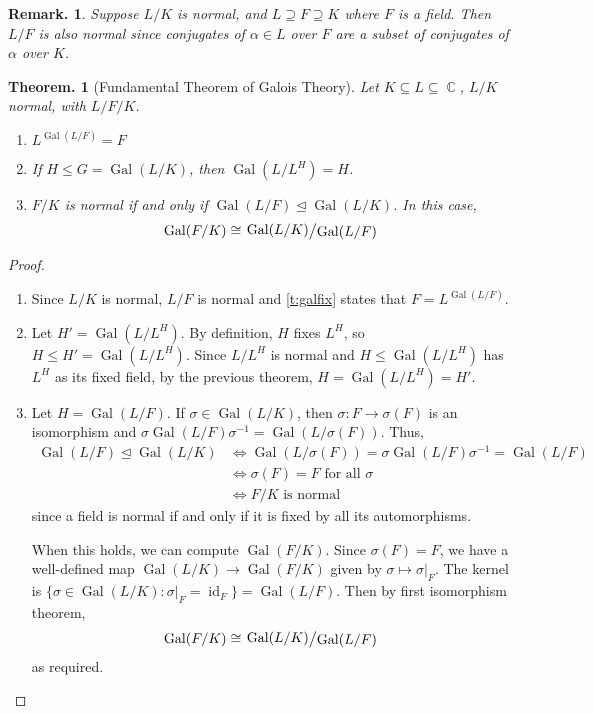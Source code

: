 \documentclass[11pt, a4paper]{memoir}
\DeclareMathOperator{\C}{{\mathbb{C}}}
\theoremstyle{change}
\newtheorem{theorem}{Theorem.}[section]
\theoremstyle{plain}
\theoremstyle{nonumberplain}
\newtheorem{remark}{Remark.}
\newtheorem{proof}{Proof}
\DeclareMathOperator{\Gal}{Gal}
\DeclareMathOperator{\id}{id}
\newcommand{\quot}[2]{\mathchoice{\left.\raisebox{0.07em}{$#1$}\middle/\raisebox{-0.07em}{$#2$}\right.}
                                 {\left.\raisebox{0.03em}{$#1$}\middle/\raisebox{-0.03em}{$#2$}\right.}
                                 {\left.\raisebox{0.00em}{$#1$}\middle/\raisebox{-0.00em}{$#2$}\right.}
                                 {\left.\raisebox{0em}{$#1$}\middle/\raisebox{0em}{$#2$}\right.}}
\numberwithin{equation}{section}
\begin{document}
\begin{remark}
    Suppose $L/K$ is normal, and $L\supseteq F\supseteq K$ where $F$ is a field.
    Then $L/F$ is also normal since conjugates of $\alpha\in L$ over $F$ are a subset of conjugates of $\alpha$ over $K$.
\end{remark}
\begin{theorem}[Fundamental Theorem of Galois Theory]\label{t:ftgt}
    Let $K\subseteq L\subseteq\C$, $L/K$ normal, with $L/F/K$.
    \begin{enumerate}[nolistsep,label=(\roman*)]
        \item $L^{\Gal(L/F)}=F$
        \item If $H\leq G=\Gal(L/K)$, then $\Gal(L/L^H)=H$.
        \item $F/K$ is normal if and only if $\Gal(L/F)\trianglelefteq\Gal(L/K)$.
            In this case,
            \begin{equation*}
                \Gal(F/K)\cong\quot{\Gal(L/K)}{\Gal(L/F)}
            \end{equation*}
    \end{enumerate}
\end{theorem}
\begin{proof}
    \begin{enumerate}[label=(\roman*)]
        \item Since $L/K$ is normal, $L/F$ is normal and \cref{t:galfix} states that $F=L^{\Gal(L/F)}$.
        \item Let $H'=\Gal(L/L^H)$.
            By definition, $H$ fixes $L^H$, so $H\leq H'=\Gal(L/L^H)$.
            Since $L/L^H$ is normal and $H\leq\Gal(L/L^H)$ has $L^H$ as its fixed field, by the previous theorem, $H=\Gal(L/L^H)=H'$.
        \item Let $H=\Gal(L/F)$.
            If $\sigma\in\Gal(L/K)$, then $\sigma:F\longrightarrow\sigma(F)$ is an isomorphism and $\sigma\Gal(L/F)\sigma^{-1}=\Gal(L/\sigma(F))$.
            Thus,
            \begin{align*}
                \Gal(L/F)\trianglelefteq\Gal(L/K) &\Longleftrightarrow \Gal(L/\sigma(F))=\sigma\Gal(L/F)\sigma^{-1}=\Gal(L/F)\\
                                                  &\Longleftrightarrow \sigma(F)=F\text{ for all }\sigma\\
                                                  &\Longleftrightarrow F/K\text{ is normal}
            \end{align*}
            since a field is normal if and only if it is fixed by all its automorphisms.

            When this holds, we can compute $\Gal(F/K)$.
            Since $\sigma(F)=F$, we have a well-defined map $\Gal(L/K)\to\Gal(F/K)$ given by $\sigma\mapsto\sigma|_F$.
            The kernel is $\{\sigma\in\Gal(L/K):\sigma|_F=\id_F\}=\Gal(L/F)$.
            Then by first isomorphism theorem,
            \begin{equation*}
                \Gal(F/K)\cong\quot{\Gal(L/K)}{\Gal(L/F)}
            \end{equation*}
            as required.
    \end{enumerate}
\end{proof}
\end{document}
